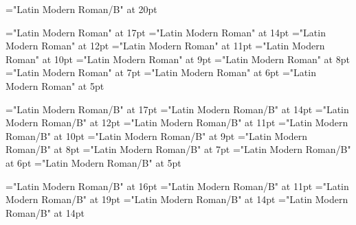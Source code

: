 
%

\def\Font #1@#2pt{\font\Fonteol=ec#1 at #2pt\Fonteol}

\font\LD@Font@Book="Latin Modern Roman/B" at 20pt
%
% 
%
%

% 

\font\seventeenrm="Latin Modern Roman" at 17pt%
\font\fourteenrm="Latin Modern Roman" at 14pt%
\font\twelverm="Latin Modern Roman" at 12pt%
\font\elevenrm="Latin Modern Roman" at 11pt%
\font\tenrm="Latin Modern Roman" at 10pt%
\font\ninerm="Latin Modern Roman" at 9pt%
\font\eightrm="Latin Modern Roman" at 8pt%
\font\sevenrm="Latin Modern Roman" at 7pt%
\font\sixrm="Latin Modern Roman" at 6pt%
\font\fiverm="Latin Modern Roman" at 5pt%

% 

\font\seventeenbf="Latin Modern Roman/B" at 17pt%
\font\fourteenbf="Latin Modern Roman/B" at 14pt%
\font\twelvebf="Latin Modern Roman/B" at 12pt%
\font\elevenbf="Latin Modern Roman/B" at 11pt%
\font\tenbf="Latin Modern Roman/B" at 10pt%
\font\ninebf="Latin Modern Roman/B" at 9pt%
\font\eightbf="Latin Modern Roman/B" at 8pt%
\font\sevenbf="Latin Modern Roman/B" at 7pt%
\font\sixbf="Latin Modern Roman/B" at 6pt%
\font\fivebf="Latin Modern Roman/B" at 5pt%


\font\chiffre="Latin Modern Roman/B" at 16pt%
\font\gras="Latin Modern Roman/B" at 11pt%
\font\TIT="Latin Modern Roman/B" at 19pt%
\font\titre="Latin Modern Roman/B" at 14pt%
\font\pti="Latin Modern Roman/B" at 14pt%

